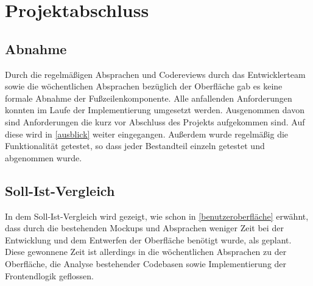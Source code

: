 \section{Projektabschluss}
\label{Projektabschluss}

\subsection{Abnahme}
\label{Abnahme}
Durch die regelmäßigen Absprachen und Codereviews durch das Entwicklerteam sowie die wöchentlichen Absprachen bezüglich der Oberfläche gab es keine formale Abnahme der Fußzeilenkomponente. Alle anfallenden Anforderungen konnten im Laufe der Implementierung umgesetzt werden. Ausgenommen davon sind Anforderungen die kurz vor Abschluss des Projekts aufgekommen sind. Auf diese wird in \ref{ausblick} weiter eingegangen. Außerdem wurde regelmäßig die Funktionalität getestet, so dass jeder Bestandteil einzeln getestet und abgenommen wurde. 
\subsection{Soll-Ist-Vergleich}
\label{sollIstVgl}
In dem Soll-Ist-Vergleich wird gezeigt, wie schon in \ref{benutzeroberfläche}  erwähnt, dass durch die bestehenden Mockups und Absprachen weniger Zeit bei der Entwicklung und dem Entwerfen der Oberfläche benötigt wurde, als geplant. Diese gewonnene Zeit ist allerdings in die wöchentlichen Absprachen zu der Oberfläche, die Analyse bestehender Codebasen sowie Implementierung der Frontendlogik geflossen.\\

